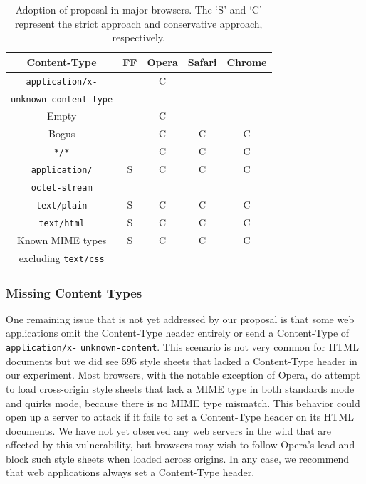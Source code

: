 \documentclass{acm_proc_article-sp}
\begin{document}
\begin{table}
\centering
\begin{tabular}{|c|c|c|c|c|} \hline
Content-Type&FF&Opera&Safari&Chrome\\ \hline
\texttt{application/x-}&&C&&\\ 
\texttt{unknown-content-type}&&&&\\ \hline
Empty&&C&&\\ \hline
Bogus&&C&C&C \\ \hline
\texttt{*/*}&&C&C&C \\ \hline
\texttt{application/}&S&C&C&C\\ 
\texttt{octet-stream}&&&&\\ \hline
\texttt{text/plain}&S&C&C&C\\ \hline
\texttt{text/html}&S&C&C&C\\ \hline
Known MIME types&S&C&C&C\\
excluding \texttt{text/css}&&&&\\
\hline\end{tabular}
\caption{Adoption of proposal in major browsers. The `S' and `C' represent the strict approach and conservative approach, respectively.}
\label{table:adoption}
\end{table}

\subsubsection{Missing Content Types}

One remaining issue that is not yet addressed by our proposal is that some web
applications omit the Content-Type header entirely or send a Content-Type of
\verb|application/x-| \verb|unknown-content|. This scenario is not very common for
HTML documents but we did see 595 style sheets that lacked a Content-Type
header in our experiment. Most browsers, 
with the notable exception of Opera, do attempt to load cross-origin
style sheets that lack a MIME type in both standards mode and quirks mode,
because there is no MIME type mismatch. This behavior could open up a server
to attack if it fails to set a Content-Type header on its HTML documents. We
have not yet observed any web servers in the wild that are affected by this
vulnerability, but browsers may wish to follow Opera's lead and block such
style sheets when loaded across origins. In any case, we recommend that web
applications always set a Content-Type header.
\end{document}

